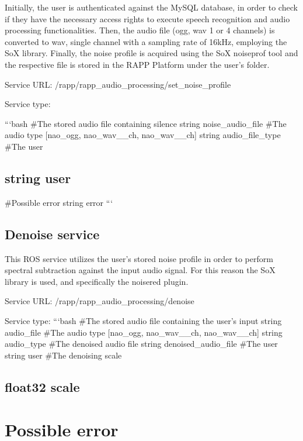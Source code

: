 Initially, the user is authenticated against the My\-S\-Q\-L database, in order to check if they have the necessary access rights to execute speech recognition and audio processing functionalities. Then, the audio file (ogg, wav 1 or 4 channels) is converted to wav, single channel with a sampling rate of 16k\-Hz, employing the So\-X library. Finally, the noise profile is acquired using the So\-X noiseprof tool and the respective file is stored in the R\-A\-P\-P Platform under the user’s folder.

Service U\-R\-L\-: {\ttfamily /rapp/rapp\-\_\-audio\-\_\-processing/set\-\_\-noise\-\_\-profile}

Service type\-:

```bash \#\-The stored audio file containing silence string noise\-\_\-audio\-\_\-file \#\-The audio type \mbox{[}nao\-\_\-ogg, nao\-\_\-wav\-\_\-\_\-ch, nao\-\_\-wav\-\_\-\_\-ch\mbox{]} string audio\-\_\-file\-\_\-type \#\-The user \subsection*{string user }

\#\-Possible error string error ```

\subsection*{Denoise service}

This R\-O\-S service utilizes the user’s stored noise profile in order to perform spectral subtraction against the input audio signal. For this reason the So\-X library is used, and specifically the noisered plugin.

Service U\-R\-L\-: {\ttfamily /rapp/rapp\-\_\-audio\-\_\-processing/denoise}

Service type\-: ```bash \#\-The stored audio file containing the user’s input string audio\-\_\-file \#\-The audio type \mbox{[}nao\-\_\-ogg, nao\-\_\-wav\-\_\-\_\-ch, nao\-\_\-wav\-\_\-\_\-ch\mbox{]} string audio\-\_\-type \#\-The denoised audio file string denoised\-\_\-audio\-\_\-file \#\-The user string user \#\-The denoising scale \subsection*{float32 scale }

\section*{Possible error}

